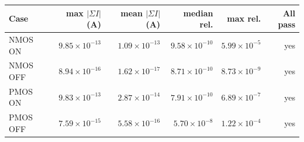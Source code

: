 \begin{tabular}{lrrrrr}
\hline
Case & max $|\Sigma I|$ (A) & mean $|\Sigma I|$ (A) & median rel. & max rel. & All pass \\
\hline
NMOS ON & $9.85\times10^{-13}$ & $1.09\times10^{-13}$ & $9.58\times10^{-10}$ & $5.99\times10^{-5}$ & yes \\
NMOS OFF & $8.94\times10^{-16}$ & $1.62\times10^{-17}$ & $8.71\times10^{-10}$ & $8.73\times10^{-9}$ & yes \\
PMOS ON & $9.83\times10^{-13}$ & $2.87\times10^{-14}$ & $7.91\times10^{-10}$ & $6.89\times10^{-7}$ & yes \\
PMOS OFF & $7.59\times10^{-15}$ & $5.58\times10^{-16}$ & $5.70\times10^{-8}$ & $1.22\times10^{-4}$ & yes \\
\hline
\end{tabular}
